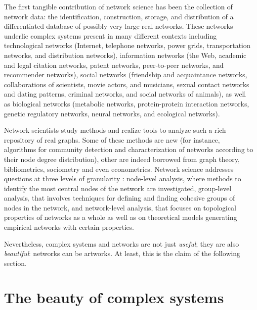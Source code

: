 \documentclass{article}
\begin{document}
The first tangible contribution of network science has been  the collection of network data: the identification, construction, storage, and distribution of a differentiated database of possibly very large real networks. These networks underlie complex systems present in many different contexts including technological networks (Internet, telephone networks, power grids, transportation networks, and distribution networks), information networks (the Web, academic and legal citation networks, patent networks, peer-to-peer networks, and recommender networks), social networks (friendship and acquaintance networks, collaborations of scientists, movie actors, and musicians, sexual contact networks and dating patterns, criminal networks, and social networks of animals), as well as biological networks (metabolic networks, protein-protein interaction networks, genetic regulatory networks, neural networks, and ecological networks). 

Network scientists study methods and realize tools to analyze such a rich repository of real graphs. Some of these methods are new (for instance, algorithms for community detection and characterization of networks according to their node degree distribution), other are indeed borrowed from graph theory, bibliometrics, sociometry and even econometrics. Network science addresses questions at three levels of granularity \cite{BE04}: node-level analysis, where methods to identify the most central nodes of the network are investigated,  group-level analysis, that involves techniques for defining and finding cohesive groups of nodes in the network, and network-level analysis, that focuses on topological properties of networks as a whole as well as on theoretical models generating empirical networks with certain properties.   

Nevertheless, complex systems and networks are not just \textit{useful}; they are also \textit{beautiful}: networks can be artworks. At least, this is the claim of the following section. 
   
\section{The beauty of complex systems}  
    
\end{document}
